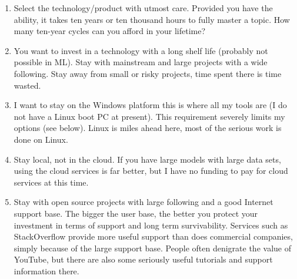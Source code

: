 \begin{enumerate}
\item {} Select the technology/product with utmost care.  Provided you have the ability, it takes ten years or ten thousand hours to fully master a topic. How many ten-year cycles can you afford in your lifetime?

\item {} You want to invest in a technology with a long shelf life (probably not possible in \ac{ML}). Stay with mainstream and large projects with a wide following. Stay away from small or risky projects, time spent there is time wasted. 
    
\item I want to stay on the Windows platform this is where all my tools are (I do not have a Linux boot PC at present).  This requirement severely limits my options (see below). Linux is miles ahead here, most of the serious work is done on Linux.
    
\item Stay local, not in the cloud.   If you have large models with large data sets, using the cloud services is far better, but I have no funding to pay for cloud services at this time.

\item Stay with open source projects with large following and a good Internet support base. The bigger the user base, the better you protect your investment in terms of support and long term survivability. Services such as StackOverflow provide more useful support than does commercial companies, simply because of the large support base. People often denigrate the value of YouTube, but there are also some seriously useful tutorials and support information there. 


\end{enumerate}
